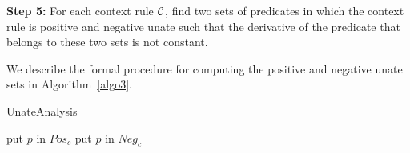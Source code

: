  \vspace{2 mm} 
 \noindent
 {\bf{Step 5:}} For each context rule ${{\cal{C}}}$, 
 		find two sets of predicates in which the context rule is positive 
        and negative unate such that the derivative of the predicate that belongs to these two sets is not constant.
 
 
 \noindent
We describe the formal procedure for computing the positive and negative unate sets in Algorithm~\ref{algo3}.
 
 
\begin{algorithm}[!htb]
  \caption{UnateAnalysis}

  \begin{algorithmic}[1]
      \State put $p$ in $Pos_c$ 
      \State put $p$ in $Neg_c$ 
    \EndIf
  \EndFor
 \EndFor
  \end{algorithmic}
  \label{algo3}
\end{algorithm}


 

